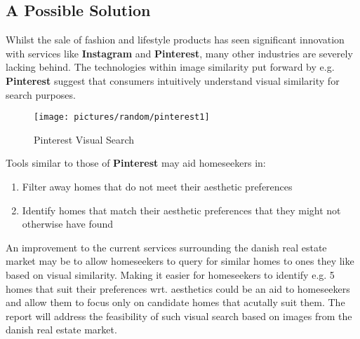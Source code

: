 \subsection{A Possible Solution}
Whilst the sale of fashion and lifestyle products has seen significant innovation with services like \textbf{Instagram} and \textbf{Pinterest}, many other industries are severely lacking behind. 
The technologies within image similarity put forward by e.g. \textbf{Pinterest}\autocite{Jing2015} suggest that consumers intuitively understand visual similarity for search purposes. 

\begin{figure}[H]
    \centering
    \texttt{[image: pictures/random/pinterest1]}
    \caption{Pinterest Visual Search}
    \label{ref:pinterest}
\end{figure}

Tools similar to those of \textbf{Pinterest} may aid homeseekers in:
\begin{enumerate}
    \item Filter away homes that do not meet their aesthetic preferences
    \item Identify homes that match their aesthetic preferences that they might not otherwise have found
\end{enumerate}

An improvement to the current services surrounding the danish real estate market may be to allow homeseekers to query for similar homes to ones they like based on visual similarity. 
Making it easier for homeseekers to identify e.g. 5 homes that suit their preferences wrt. aesthetics could be an aid to homeseekers and allow them to focus only on candidate homes that acutally suit them. 
\newline
The report will address the feasibility of such visual search based on images from the danish real estate market.